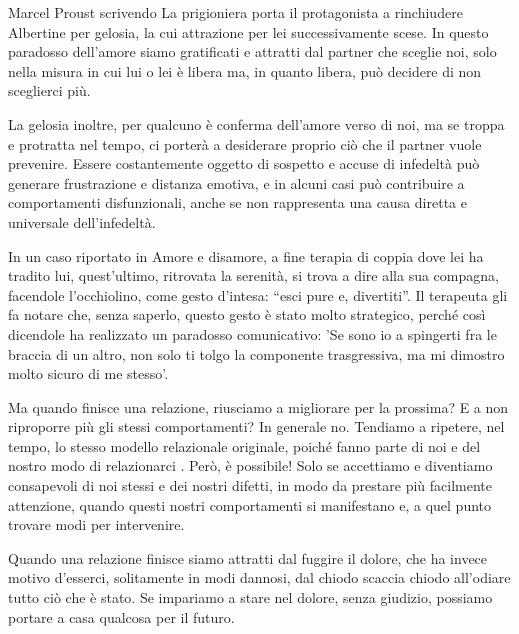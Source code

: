 \documentclass[12pt]{book} %
\begin{document}
\begin{mdframed}[linewidth=1pt]
Marcel Proust scrivendo La prigioniera porta il protagonista a rinchiudere Albertine per gelosia, la cui attrazione per
lei successivamente scese. In questo paradosso dell'amore siamo gratificati e attratti dal partner
che sceglie noi, solo nella misura in cui lui o lei è libera ma, in quanto libera, può decidere di non sceglierci più.

La gelosia inoltre, per qualcuno è conferma dell'amore verso di noi, ma se troppa e protratta nel
tempo, ci porterà a desiderare proprio ciò che il partner vuole prevenire. Essere costantemente oggetto di sospetto e accuse di infedeltà può generare frustrazione e distanza emotiva, e in alcuni casi può contribuire a comportamenti disfunzionali, anche se non rappresenta una causa diretta e universale dell’infedeltà.

In un caso riportato in Amore e disamore, a fine terapia di coppia dove
lei ha tradito lui, quest'ultimo, ritrovata la serenità, si trova a dire alla sua compagna,
facendole l'occhiolino, come gesto d'intesa: “esci pure e, divertiti”. Il
terapeuta gli fa notare che, senza saperlo, questo gesto è stato molto strategico, perché così dicendole ha realizzato
un paradosso comunicativo: 'Se sono io a spingerti fra le braccia di un altro, non solo ti tolgo
la componente trasgressiva, ma mi dimostro molto sicuro di me stesso'.
\end{mdframed}

Ma quando finisce una relazione, riusciamo a migliorare per la prossima? E a non riproporre più gli stessi comportamenti? In generale no. Tendiamo a ripetere, nel tempo, lo stesso modello relazionale originale, poiché fanno parte di
noi e del nostro modo di relazionarci
. Però, è possibile! Solo se
accettiamo e diventiamo consapevoli di noi stessi e dei nostri difetti, in modo da prestare più facilmente attenzione,
quando questi nostri comportamenti si manifestano e, a quel punto trovare modi per intervenire. 

Quando una relazione finisce siamo attratti dal fuggire il dolore, che ha invece motivo d'esserci,
solitamente in modi dannosi, dal chiodo scaccia chiodo all'odiare tutto ciò che è stato. Se
impariamo a stare nel dolore, senza giudizio, possiamo portare a casa qualcosa per il futuro.
\end{document}
